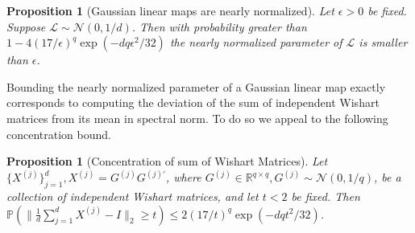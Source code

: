 \documentclass[11pt,letterpaper]{article}
\newtheorem{proposition}[theorem]{Proposition}
\newcommand{\R}{\mathbb{R}}
\begin{document}
\begin{proposition}[Gaussian linear maps are nearly normalized]\label{thm:rowcoldev}
	Let $\epsilon>0$ be fixed.  Suppose $\mathcal{L} \sim \mathcal{N}(0, 1/d)$.  Then with probability greater than $1-4 (17/\epsilon)^{q} \exp( - dq\epsilon^2 / 32)$ the nearly normalized parameter of $\mathcal{L}$ is smaller than $\epsilon$.
\end{proposition}

Bounding the nearly normalized parameter of a Gaussian linear map exactly corresponds to computing the deviation of the sum of independent Wishart matrices from its mean in spectral norm.  To do so we appeal to the following concentration bound.

\begin{proposition}[Concentration of sum of Wishart Matrices] \label{thm:concentrationwishart}
	Let $\{X^{(j)} \}_{j=1}^{d}, X^{(j)} = G^{(j)} G^{(j)\prime}$, where $G^{(j)} \in \R^{q\times q}, G^{(j)} \sim \mathcal{N}(0,1/q)$, be a collection of independent Wishart matrices, and let $t<2$ be fixed.  Then $\mathbb{P} ( \|\frac{1}{d}\sum_{j=1}^{d} X^{(j)} - I  \|_2 \geq t) \leq 2(17/t)^{q} \exp( - dq t^2 / 32)$.
\end{proposition}
\end{document}
